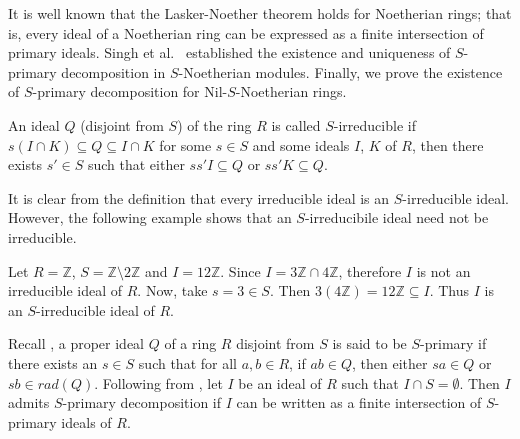 \documentclass[11pt]{article}
\begin{document}
It is well known that the Lasker-Noether theorem holds for Noetherian rings; that is, every ideal of a Noetherian ring can be expressed as a finite intersection of primary ideals. Singh et al.~\cite{ts24} established the existence and uniqueness of $S$-primary decomposition in $S$-Noetherian modules. Finally, we prove the existence of $S$-primary decomposition for Nil-$S$-Noetherian rings.


\begin{deff}\label{S-iir.}\cite{ts24}
	An ideal $Q$ (disjoint from $S$) of the ring $R$ is called  $S$-irreducible if $s(I\cap K)\subseteq Q \subseteq I\cap K$ for some $s\in S$ and some ideals $I$, $K$ of $R$, then there exists $s'\in S$ such that either $ss'I\subseteq Q$ or $ss'K\subseteq Q$.
\end{deff}

\noindent
It is clear from the definition that every irreducible ideal is an $S$-irreducible ideal. However, the following example shows that an $S$-irreducibile ideal need not be irreducible. 
\begin{eg}\label{fm}
	\noindent
	Let $R=\mathbb{Z}$, $S=\mathbb{Z}\setminus 2\mathbb{Z}$ and $I=12\mathbb{Z}$. Since $I=3\mathbb{Z}\cap 4\mathbb{Z}$, therefore $I$ is not an irreducible ideal of $R$. Now, take $s=3\in S$. Then $3(4\mathbb{Z})=12\mathbb{Z}\subseteq I$. Thus $I$ is an $S$-irreducible ideal of $R$.
\end{eg}
\noindent
Recall \cite[Definition 2.1]{me22}, a proper ideal $Q$ of a ring $R$ disjoint from $S$ is said to be $S$-primary if there exists an $s \in S$ such that for all $a, b \in R$, if $ab \in Q$, then either $sa \in Q$ or $sb \in rad(Q)$. Following from \cite{ts24}, let
$I$ be an ideal of $R$ such that $I\cap S=\emptyset$. Then $I$ admits $S$-primary decomposition if $I$ can be written as a finite intersection of $S$-primary ideals of $R$.\\
\end{document}
